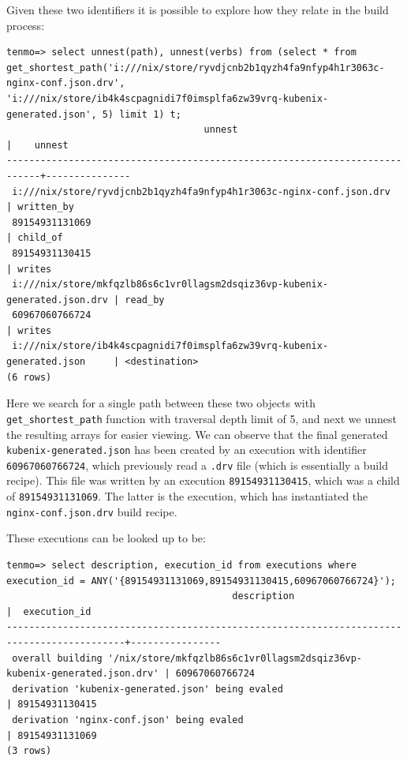 Given these two identifiers it is possible to explore how they relate in the build process:
%
\begin{verbatim}
tenmo=> select unnest(path), unnest(verbs) from (select * from get_shortest_path('i:///nix/store/ryvdjcnb2b1qyzh4fa9nfyp4h1r3063c-nginx-conf.json.drv', 'i:///nix/store/ib4k4scpagnidi7f0imsplfa6zw39vrq-kubenix-generated.json', 5) limit 1) t;
                                   unnest                                   |    unnest     
----------------------------------------------------------------------------+---------------
 i:///nix/store/ryvdjcnb2b1qyzh4fa9nfyp4h1r3063c-nginx-conf.json.drv        | written_by
 89154931131069                                                             | child_of
 89154931130415                                                             | writes
 i:///nix/store/mkfqzlb86s6c1vr0llagsm2dsqiz36vp-kubenix-generated.json.drv | read_by
 60967060766724                                                             | writes
 i:///nix/store/ib4k4scpagnidi7f0imsplfa6zw39vrq-kubenix-generated.json     | <destination>
(6 rows)
\end{verbatim}

Here we search for a single path between these two objects with \texttt{get\_shortest\_path} function with traversal depth limit of 5, and next we unnest the resulting arrays for easier viewing. We can observe that the final generated \texttt{kubenix-generated.json} has been created by an execution with identifier \texttt{60967060766724}, which previously read a \texttt{.drv} file (which is essentially a build recipe). This file was written by an execution \texttt{89154931130415}, which was a child of \texttt{89154931131069}. The latter is the execution, which has instantiated the \texttt{nginx-conf.json.drv} build recipe.

These executions can be looked up to be:
\begin{verbatim}
tenmo=> select description, execution_id from executions where execution_id = ANY('{89154931131069,89154931130415,60967060766724}');
                                        description                                        |  execution_id  
-------------------------------------------------------------------------------------------+----------------
 overall building '/nix/store/mkfqzlb86s6c1vr0llagsm2dsqiz36vp-kubenix-generated.json.drv' | 60967060766724
 derivation 'kubenix-generated.json' being evaled                                          | 89154931130415
 derivation 'nginx-conf.json' being evaled                                                 | 89154931131069
(3 rows)
\end{verbatim}

